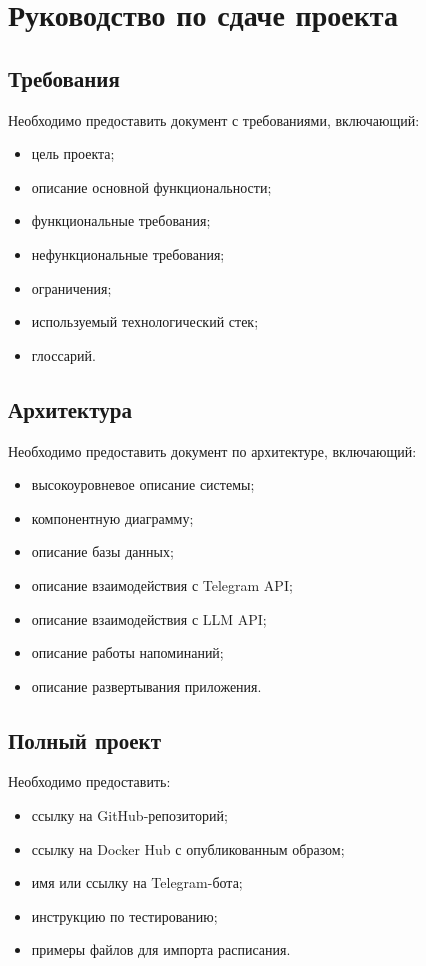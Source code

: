 \documentclass[10pt,a4paper,final]{article} %
\begin{document}
\section{Руководство по сдаче проекта}

\subsection{Требования}

Необходимо предоставить документ с требованиями, включающий:

\begin{itemize}
    \item цель проекта;
    \item описание основной функциональности;
    \item функциональные требования;
    \item нефункциональные требования;
    \item ограничения;
    \item используемый технологический стек;
    \item глоссарий.
\end{itemize}

\subsection{Архитектура}

Необходимо предоставить документ по архитектуре, включающий:

\begin{itemize}
    \item высокоуровневое описание системы;
    \item компонентную диаграмму;
    \item описание базы данных;
    \item описание взаимодействия с Telegram API;
    \item описание взаимодействия с LLM API;
    \item описание работы напоминаний;
    \item описание развертывания приложения.
\end{itemize}

\subsection{Полный проект}

Необходимо предоставить:

\begin{itemize}
    \item ссылку на GitHub-репозиторий;
    \item ссылку на Docker Hub с опубликованным образом;
    \item имя или ссылку на Telegram-бота;
    \item инструкцию по тестированию;
    \item примеры файлов для импорта расписания.
\end{itemize}
\end{document}
